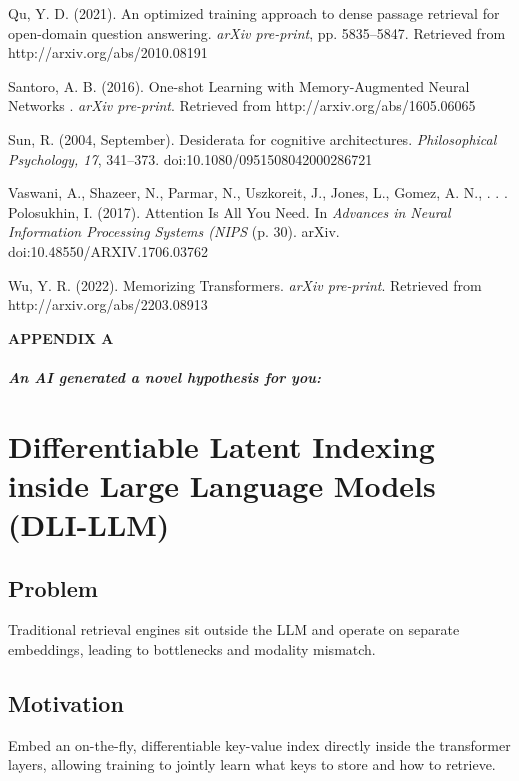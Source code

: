 \documentclass[
]{article}
\begin{document}
Qu, Y. D. (2021). An optimized training approach to dense passage
retrieval for open-domain question answering. \emph{arXiv pre-print},
pp. 5835--5847. Retrieved from http://arxiv.org/abs/2010.08191

Santoro, A. B. (2016). One-shot Learning with Memory-Augmented Neural
Networks . \emph{arXiv pre-print}. Retrieved from
http://arxiv.org/abs/1605.06065

Sun, R. (2004, September). Desiderata for cognitive architectures.
\emph{Philosophical Psychology, 17}, 341--373.
doi:10.1080/0951508042000286721

Vaswani, A., Shazeer, N., Parmar, N., Uszkoreit, J., Jones, L., Gomez,
A. N., . . . Polosukhin, I. (2017). Attention Is All You Need. In
\emph{Advances in Neural Information Processing Systems (NIPS} (p. 30).
arXiv. doi:10.48550/ARXIV.1706.03762

Wu, Y. R. (2022). Memorizing Transformers. \emph{arXiv pre-print}.
Retrieved from http://arxiv.org/abs/2203.08913

\textbf{APPENDIX A}

\hypertarget{an-ai-generated-a-novel-hypothesis-for-you}{%
\subparagraph{An AI generated a novel hypothesis for
you:}\label{an-ai-generated-a-novel-hypothesis-for-you}}

\hypertarget{differentiable-latent-indexing-inside-large-language-models-dli-llm}{%
\section{Differentiable Latent Indexing inside Large Language Models
(DLI-LLM)}\label{differentiable-latent-indexing-inside-large-language-models-dli-llm}}

\hypertarget{problem}{%
\subsection{Problem}\label{problem}}

Traditional retrieval engines sit outside the LLM and operate on
separate embeddings, leading to bottlenecks and modality mismatch.

\hypertarget{motivation}{%
\subsection{Motivation}\label{motivation}}

Embed an on-the-fly, differentiable key-value index directly inside the
transformer layers, allowing training to jointly learn what keys to
store and how to retrieve.
\end{document}

